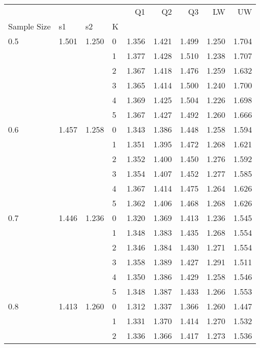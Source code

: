 \begin{tabular}{llllrrrrr}
\toprule
    &       &       &   &     Q1 &     Q2 &     Q3 &     LW &     UW \\
Sample Size & s1 & s2 & K &        &        &        &        &        \\
\midrule
0.5 & 1.501 & 1.250 & 0 &  1.356 &  1.421 &  1.499 &  1.250 &  1.704 \\
    &       &       & 1 &  1.377 &  1.428 &  1.510 &  1.238 &  1.707 \\
    &       &       & 2 &  1.367 &  1.418 &  1.476 &  1.259 &  1.632 \\
    &       &       & 3 &  1.365 &  1.414 &  1.500 &  1.240 &  1.700 \\
    &       &       & 4 &  1.369 &  1.425 &  1.504 &  1.226 &  1.698 \\
    &       &       & 5 &  1.367 &  1.427 &  1.492 &  1.260 &  1.666 \\
0.6 & 1.457 & 1.258 & 0 &  1.343 &  1.386 &  1.448 &  1.258 &  1.594 \\
    &       &       & 1 &  1.351 &  1.395 &  1.472 &  1.268 &  1.621 \\
    &       &       & 2 &  1.352 &  1.400 &  1.450 &  1.276 &  1.592 \\
    &       &       & 3 &  1.354 &  1.407 &  1.452 &  1.277 &  1.585 \\
    &       &       & 4 &  1.367 &  1.414 &  1.475 &  1.264 &  1.626 \\
    &       &       & 5 &  1.362 &  1.406 &  1.468 &  1.268 &  1.626 \\
0.7 & 1.446 & 1.236 & 0 &  1.320 &  1.369 &  1.413 &  1.236 &  1.545 \\
    &       &       & 1 &  1.348 &  1.383 &  1.435 &  1.268 &  1.554 \\
    &       &       & 2 &  1.346 &  1.384 &  1.430 &  1.271 &  1.554 \\
    &       &       & 3 &  1.358 &  1.389 &  1.427 &  1.291 &  1.511 \\
    &       &       & 4 &  1.350 &  1.386 &  1.429 &  1.258 &  1.546 \\
    &       &       & 5 &  1.348 &  1.387 &  1.433 &  1.266 &  1.553 \\
0.8 & 1.413 & 1.260 & 0 &  1.312 &  1.337 &  1.366 &  1.260 &  1.447 \\
    &       &       & 1 &  1.331 &  1.370 &  1.414 &  1.270 &  1.532 \\
    &       &       & 2 &  1.336 &  1.366 &  1.417 &  1.273 &  1.536 \\

\end{tabular}
